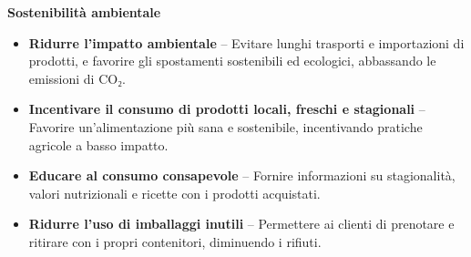 \textbf{Sostenibilità ambientale}    
\begin{itemize}
    \item  \textbf{Ridurre l'impatto ambientale} – Evitare lunghi trasporti e importazioni di prodotti, e favorire gli spostamenti sostenibili ed ecologici, abbassando le emissioni di CO₂.
    \item  \textbf{Incentivare il consumo di prodotti locali, freschi e stagionali} – Favorire un'alimentazione più sana e sostenibile, incentivando pratiche agricole a basso impatto.
    \item  \textbf{Educare al consumo consapevole} – Fornire informazioni su stagionalità, valori nutrizionali e ricette con i prodotti acquistati.
    \item  \textbf{Ridurre l'uso di imballaggi inutili} – Permettere ai clienti di prenotare e ritirare con i propri contenitori, diminuendo i rifiuti.
\end{itemize}


